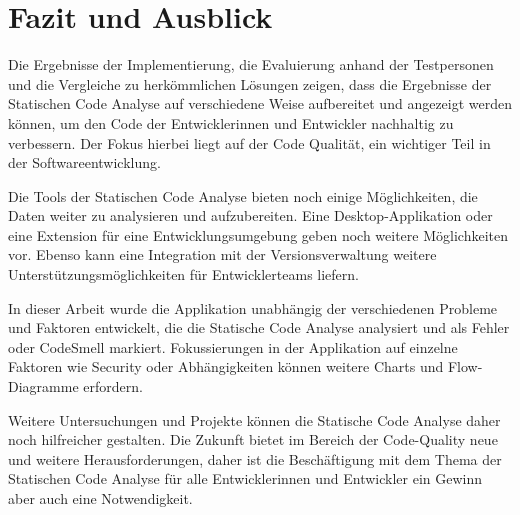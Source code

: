 \chapter{Fazit und Ausblick}
\label{chap:conclusion}
\chapterstart
Die Ergebnisse der Implementierung, die Evaluierung anhand der Testpersonen und die Vergleiche zu herkömmlichen Lösungen zeigen, dass die Ergebnisse der Statischen Code Analyse auf verschiedene Weise aufbereitet und angezeigt werden können, um den Code der Entwicklerinnen und Entwickler nachhaltig zu verbessern. Der Fokus hierbei liegt auf der Code Qualität, ein wichtiger Teil in der Softwareentwicklung.

Die Tools der Statischen Code Analyse bieten noch einige Möglichkeiten, die Daten weiter zu analysieren und aufzubereiten. Eine Desktop-Applikation oder eine Extension für eine Entwicklungsumgebung geben noch weitere Möglichkeiten vor. Ebenso kann eine Integration mit der Versionsverwaltung weitere Unterstützungsmöglichkeiten für Entwicklerteams liefern.

In dieser Arbeit wurde die Applikation unabhängig der verschiedenen Probleme und Faktoren entwickelt, die die Statische Code Analyse analysiert und als Fehler oder CodeSmell markiert. Fokussierungen in der Applikation auf einzelne Faktoren wie Security oder Abhängigkeiten können weitere Charts und Flow-Diagramme erfordern.

Weitere Untersuchungen und Projekte können die Statische Code Analyse daher noch hilfreicher gestalten. Die Zukunft bietet im Bereich der Code-Quality neue und weitere Herausforderungen, daher ist die Beschäftigung mit dem Thema der Statischen Code Analyse für alle Entwicklerinnen und Entwickler ein Gewinn aber auch eine Notwendigkeit.


\chapterend
